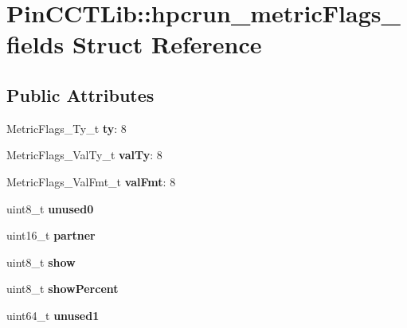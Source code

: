 \hypertarget{structPinCCTLib_1_1hpcrun__metricFlags__fields}{\section{Pin\-C\-C\-T\-Lib\-:\-:hpcrun\-\_\-metric\-Flags\-\_\-fields Struct Reference}
\label{structPinCCTLib_1_1hpcrun__metricFlags__fields}
}
\subsection*{Public Attributes}
\begin{DoxyCompactItemize}
\item 
\hypertarget{structPinCCTLib_1_1hpcrun__metricFlags__fields_a075b383c15bc66ef20c1127180568327}{Metric\-Flags\-\_\-\-Ty\-\_\-t {\bfseries ty}\-: 8}\label{structPinCCTLib_1_1hpcrun__metricFlags__fields_a075b383c15bc66ef20c1127180568327}

\item 
\hypertarget{structPinCCTLib_1_1hpcrun__metricFlags__fields_ae458ae3742e49dd95d6fba8e24df12d3}{Metric\-Flags\-\_\-\-Val\-Ty\-\_\-t {\bfseries val\-Ty}\-: 8}\label{structPinCCTLib_1_1hpcrun__metricFlags__fields_ae458ae3742e49dd95d6fba8e24df12d3}

\item 
\hypertarget{structPinCCTLib_1_1hpcrun__metricFlags__fields_aa6e8850129a81cdac958757d04481f90}{Metric\-Flags\-\_\-\-Val\-Fmt\-\_\-t {\bfseries val\-Fmt}\-: 8}\label{structPinCCTLib_1_1hpcrun__metricFlags__fields_aa6e8850129a81cdac958757d04481f90}

\item 
\hypertarget{structPinCCTLib_1_1hpcrun__metricFlags__fields_a698d4a77e7573bf3c009b4854deab6c1}{uint8\-\_\-t {\bfseries unused0}}\label{structPinCCTLib_1_1hpcrun__metricFlags__fields_a698d4a77e7573bf3c009b4854deab6c1}

\item 
\hypertarget{structPinCCTLib_1_1hpcrun__metricFlags__fields_abb7a074806b8750589770c45602bb564}{uint16\-\_\-t {\bfseries partner}}\label{structPinCCTLib_1_1hpcrun__metricFlags__fields_abb7a074806b8750589770c45602bb564}

\item 
\hypertarget{structPinCCTLib_1_1hpcrun__metricFlags__fields_aa962355d732e6efe6895019cc2d63658}{uint8\-\_\-t {\bfseries show}}\label{structPinCCTLib_1_1hpcrun__metricFlags__fields_aa962355d732e6efe6895019cc2d63658}

\item 
\hypertarget{structPinCCTLib_1_1hpcrun__metricFlags__fields_aa7286d604836682b9d8b799f88f99c4e}{uint8\-\_\-t {\bfseries show\-Percent}}\label{structPinCCTLib_1_1hpcrun__metricFlags__fields_aa7286d604836682b9d8b799f88f99c4e}

\item 
\hypertarget{structPinCCTLib_1_1hpcrun__metricFlags__fields_aa047bcb77dc90c23f1e6cbd1e7a961ca}{uint64\-\_\-t {\bfseries unused1}}\label{structPinCCTLib_1_1hpcrun__metricFlags__fields_aa047bcb77dc90c23f1e6cbd1e7a961ca}

\end{DoxyCompactItemize}


